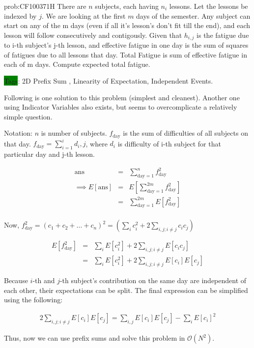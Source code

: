 \begin{problem}{prob:CF100371H}
There are $n$ subjects, each having $n_i$ lessons. Let the lessons be indexed by $j$. We are looking at the first $m$ days of the semester. Any subject can start on any of the m days (even if all it's lesson's don't fit till the end), and each lesson will follow consecutively and contigously. Given that $h_{i,j}$ is the fatigue due to i-th subject's j-th lesson, and effective fatigue in one day is the sum of squares of fatigues due to all lessons that day. Total Fatigue is sum of effective fatigue in each of m days. Compute expected total fatigue.

\colorbox{green}{Tags}: 2D Prefix Sum , Linearity of Expectation, Independent Events.
\end{problem}

Following is one solution to this problem (simplest and cleanest). Another one using Indicator Variables also exists, but seems to overcomplicate a relatively simple question.


Notation: $n$ is number of subjects. $f_{\text{day}}$ is the sum of difficulties of all subjects on that day. $f_{\text{day}} = \sum_{i=1}^{i}d_i,j$, where $d_i$ is difficulty of i-th subject for that particular day and j-th lesson.

\begin{eqnarray*}
    \text{ans} &=& \sum_{\text{day}=1}^{n} f_{\text{day}}^2 \\
    \implies E[\text{ans}] &=&  E\left[\sum_{\text{day}=1}^{2m}f_{\text{day}}^2 \right] \\
    &=& \sum_{\text{day}=1}^{2m}E\left[f_{\text{day}}^2\right]  \\
\end{eqnarray*}

Now, $f_{\text{day}}^2 = (c_1+c_2+\ldots+c_n)^2=(\sum_{i}c_i^2 + 2\sum_{i,j; i\ne j}c_ic_j)$

\begin{eqnarray*}
    E\left[f_{\text{day}}^2\right]&=&\sum_{i}E[c_i^2] + 2\sum_{i,j; i\ne j}E[c_ic_j] \\
    &=& \sum_{i}E[c_i^2] + 2\sum_{i,j; i\ne j}E[c_i]E[c_j]
\end{eqnarray*}

Because $i$-th and $j$-th subject's contribution on the same day are independent of each other, their expectations can be split. The final expression can be simplified using the following:

\begin{eqnarray*}
    2\sum_{i,j; i\ne j}E[c_i]E[c_j] = \sum_{i,j}E[c_i]E[c_j] - \sum_{i}E[c_i]^2
\end{eqnarray*}

Thus, now we can use prefix sums and solve this problem in $\mathcal{O}(N^2)$.

